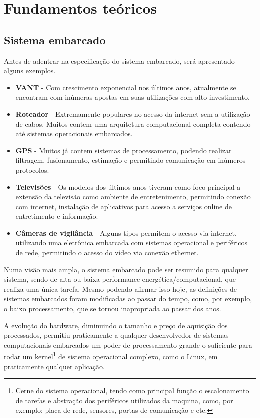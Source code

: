 \chapter{Fundamentos teóricos}

\section{Sistema embarcado}
Antes de adentrar na especificação do sistema embarcado, será apresentado alguns exemplos.

\begin{itemize}
\item \textbf{VANT} - Com crescimento exponencial nos últimos anos, atualmente se encontram com inúmeras apostas em suas utilizações com alto investimento.
\item \textbf{Roteador} - Extremamente populares no acesso da internet sem a utilização de cabos. Muitos contem uma arquitetura computacional completa contendo até sistemas operacionais embarcados.
\item \textbf{GPS} - Muitos já contem sistemas de processamento, podendo realizar filtragem, fusionamento, estimação e permitindo comunicação em inúmeros protocolos.
\item \textbf{Televisões} - Os modelos dos últimos anos tiveram como foco principal a extensão da televisão como ambiente de entretenimento, permitindo conexão com internet, instalação de aplicativos para acesso a serviços online de entretimento e informação.
\item \textbf{Câmeras de vigilância} - Alguns tipos permitem o acesso via internet, utilizando uma eletrônica embarcada com sistemas operacional e periféricos de rede, permitindo o acesso do vídeo via conexão ethernet.
\end{itemize}


Numa visão mais ampla, o sistema embarcado pode ser resumido para qualquer sistema, sendo de alta ou baixa performance energética/computacional, que realiza uma única tarefa. Mesmo podendo afirmar isso hoje, as definições de sistemas embarcados foram modificadas ao passar do tempo, como, por exemplo, o baixo processamento, que se tornou inapropriada ao passar dos anos.

A evolução do hardware, diminuindo o tamanho e preço de aquisição dos processados, permitiu praticamente a qualquer desenvolvedor de sistemas computacionais embarcados um poder de processamento grande o suficiente para rodar um kernel\footnote{Cerne do sistema operacional, tendo como principal função o escalonamento de tarefas e abstração dos periféricos utilizados da maquina, como, por exemplo: placa de rede, sensores, portas de comunicação e etc.} de sistema operacional complexo, como o Linux, em praticamente qualquer aplicação.

